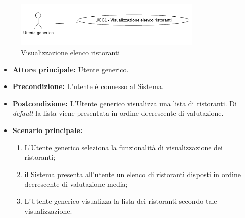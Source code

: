 
\label{usecase:Visualizzazione elenco ristoranti}

\begin{figure}[h]
	\centering
	\includegraphics[width=0.8\textwidth]{./uml/UCG1.png} 
	\caption{Visualizzazione elenco ristoranti}
	\label{fig:UCG1}
  \end{figure}

\begin{itemize}
	\item \textbf{Attore principale:} Utente generico.

	\item \textbf{Precondizione:}
	      L'utente è connesso al Sistema.

	\item \textbf{Postcondizione:} L'Utente generico visualizza una lista di
	      ristoranti. Di \textit{default} la lista viene presentata in ordine decrescente di valutazione.

	\item \textbf{Scenario principale:}
	      \begin{enumerate}
		      \item L'Utente generico seleziona la funzionalità di
		            visualizzazione dei ristoranti;

		      \item il Sistema presenta all'utente un elenco di ristoranti disposti in ordine decrescente di valutazione media;

		      \item L'Utente generico visualizza la lista dei ristoranti secondo tale visualizzazione.

	      \end{enumerate}
\end{itemize}
